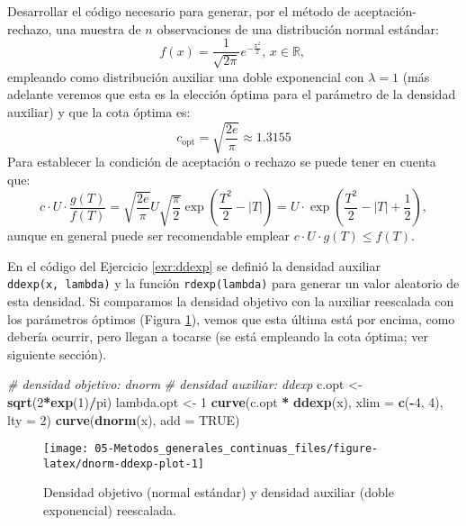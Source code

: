 \documentclass[
]{book}
\newenvironment{Shaded}{\begin{snugshade}}{\end{snugshade}}
\newcommand{\CommentTok}[1]{\textcolor[rgb]{0.56,0.35,0.01}{\textit{#1}}}
\newcommand{\DataTypeTok}[1]{\textcolor[rgb]{0.13,0.29,0.53}{#1}}
\newcommand{\DecValTok}[1]{\textcolor[rgb]{0.00,0.00,0.81}{#1}}
\newcommand{\KeywordTok}[1]{\textcolor[rgb]{0.13,0.29,0.53}{\textbf{#1}}}
\newcommand{\NormalTok}[1]{#1}
\newcommand{\OperatorTok}[1]{\textcolor[rgb]{0.81,0.36,0.00}{\textbf{#1}}}
\newcommand{\OtherTok}[1]{\textcolor[rgb]{0.56,0.35,0.01}{#1}}
\newcommand{\StringTok}[1]{\textcolor[rgb]{0.31,0.60,0.02}{#1}}
\theoremstyle{break}
\theoremstyle{definition}
\theoremstyle{definition}
\theoremstyle{definition}
\theoremstyle{remark}
\begin{document}
Desarrollar el código necesario para generar, por el método de
aceptación-rechazo, una muestra de \(n\) observaciones de una
distribución normal estándar:
\[f\left( x\right)  =\frac{1}{\sqrt{2\pi}}e^{-\frac{x^{2}}{2}}\text{, }x\in\mathbb{R}\text{, }\]
empleando como distribución auxiliar una doble exponencial con \(\lambda=1\)
(más adelante veremos que esta es la elección óptima para el parámetro de la densidad auxiliar) y que la cota óptima es:
\[c_{\text{opt}}=\sqrt{\frac{2e}{\pi}} \approx 1.3155\]
Para establecer la condición de aceptación o rechazo se puede tener en cuenta que:
\[c\cdot U\cdot\frac{g\left( T\right)  }{f\left( T\right)  }=\sqrt{\frac
{2e}{\pi}}U\sqrt{\frac{\pi}{2}}\exp\left( \frac{T^{2}}{2}-\left\vert
T\right\vert \right)  =U\cdot\exp\left( \frac{T^{2}}{2}-\left\vert
T\right\vert +\frac{1}{2}\right) ,\]
aunque en general puede ser recomendable emplear
\(c\cdot U\cdot g\left( T\right) \leq f\left( T\right)\).

En el código del Ejercicio \ref{exr:ddexp} se definió la densidad auxiliar \texttt{ddexp(x,\ lambda)} y la función \texttt{rdexp(lambda)} para generar un valor aleatorio de esta densidad.
Si comparamos la densidad objetivo con la auxiliar reescalada con los parámetros óptimos (Figura \ref{fig:dnorm-ddexp-plot}), vemos que esta última está por encima, como debería ocurrir, pero llegan a tocarse (se está empleando la cota óptima; ver siguiente sección).

\begin{Shaded}
\begin{Highlighting}[]
\CommentTok{# densidad objetivo: dnorm}
\CommentTok{# densidad auxiliar: ddexp}
\NormalTok{c.opt <-}\StringTok{ }\KeywordTok{sqrt}\NormalTok{(}\DecValTok{2}\OperatorTok{*}\KeywordTok{exp}\NormalTok{(}\DecValTok{1}\NormalTok{)}\OperatorTok{/}\NormalTok{pi)}
\NormalTok{lambda.opt <-}\StringTok{ }\DecValTok{1}
\KeywordTok{curve}\NormalTok{(c.opt }\OperatorTok{*}\StringTok{ }\KeywordTok{ddexp}\NormalTok{(x), }\DataTypeTok{xlim =} \KeywordTok{c}\NormalTok{(}\OperatorTok{-}\DecValTok{4}\NormalTok{, }\DecValTok{4}\NormalTok{), }\DataTypeTok{lty =} \DecValTok{2}\NormalTok{)}
\KeywordTok{curve}\NormalTok{(}\KeywordTok{dnorm}\NormalTok{(x), }\DataTypeTok{add =} \OtherTok{TRUE}\NormalTok{)}
\end{Highlighting}
\end{Shaded}

\begin{figure}[!htb]

{\centering \texttt{[image: 05-Metodos\_generales\_continuas\_files/figure-latex/dnorm-ddexp-plot-1]} 

}

\caption{Densidad objetivo (normal estándar) y densidad auxiliar (doble exponencial) reescalada.}\label{fig:dnorm-ddexp-plot}
\end{figure}
\end{document}
